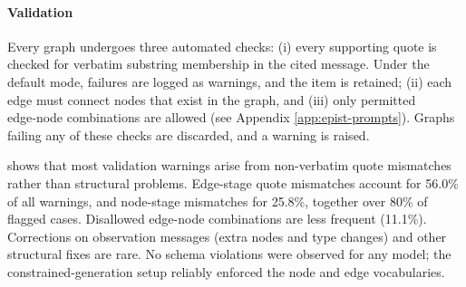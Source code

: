 \paragraph{Validation} Every graph undergoes three automated checks: (i) every supporting quote is checked for verbatim substring membership in the cited message. Under the default mode, failures are logged as warnings, and the item is retained; (ii) each edge must connect nodes that exist in the graph, and (iii) only permitted edge‑node combinations are allowed (see Appendix \ref{app:epist-prompts}). Graphs failing any of these checks are discarded, and a warning is raised. 

 shows that most validation warnings arise from non-verbatim quote mismatches rather than structural problems. Edge-stage quote mismatches account for 56.0\% of all warnings, and node-stage mismatches for 25.8\%, together over 80\% of flagged cases. Disallowed edge-node combinations are less frequent (11.1\%). Corrections on observation messages (extra nodes and type changes) and other structural fixes are rare. No schema violations were observed for any model; the constrained-generation setup reliably enforced the node and edge vocabularies.

\begin{table}[H]
    \centering
    \caption{\textbf{Quality‑control warning counts by failure mode and model.} Each annotated reasoning graph was automatically validated after generation. Non‑verbatim quote warnings occur when the cited evidence excerpt for a node (node stage) or an edge (edge stage) is not an exact substring of the source trace; such annotations are retained but flagged. \textit{Disallowed combination} denotes an edge whose relation–type triple falls outside the permitted schema vocabulary. \textit{Extra node at observation message} counts evidence/claim nodes that were injected into observation‑only messages and subsequently removed. \textit{Node type corrected to enforce E‑only rule} counts nodes whose type was automatically changed to enforce the constraint that observation messages may contain only Evidence nodes. \textit{Other} captures miscellaneous structural corrections (e.g., node additions or residual type fixes). Schema violations (invalid node types or edge relations outside the vocabulary) were never observed. Percentages are computed over the total number of warnings across all models.}
    \label{tab:epist_val}
    
\end{table}



